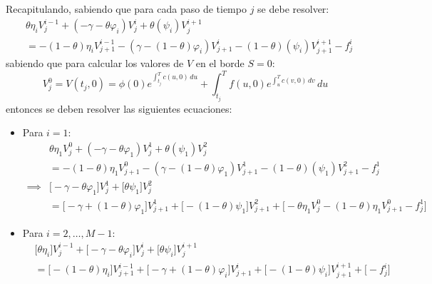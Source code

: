 Recapitulando, sabiendo que para cada paso de tiempo $j$ se debe resolver:
\begin{align*}
    &\theta\eta_i V_j^{i-1} +\left( -\gamma - \theta \varphi_i \right)V_j^i +\theta\left( \psi_i \right)V_j^{i+1} \\
    &= - (1-\theta)\eta_i V_{j+1}^{i-1} -\left( \gamma - (1-\theta) \varphi_i \right)V_{j+1}^i - (1-\theta)\left( \psi_i \right)V_{j+1}^{i+1} - f_j^i
\end{align*}
sabiendo que para calcular los valores de $V$ en el borde $S=0$:
\begin{equation*}
    V_j^0 = V(t_j, 0) = \phi(0) e^{\int_{t_j}^T c(u, 0)\,du} + \int_{t_j}^T f(u, 0) e^{\int_u^T c(v, 0)\,dv}\,du
\end{equation*}
entonces se deben resolver las siguientes ecuaciones:
\begin{itemize}
    \item Para $i=1$:
        \begin{align*}
            &\theta\eta_1 V_j^{0} +\left( -\gamma - \theta \varphi_1 \right)V_j^1 +\theta\left( \psi_1 \right)V_j^{2} \\
            &= - (1-\theta)\eta_1 V_{j+1}^{0} -\left( \gamma - (1-\theta) \varphi_1 \right)V_{j+1}^1 - (1-\theta)\left( \psi_1 \right)V_{j+1}^{2} - f_j^1 \\
            \implies &\bigg[ -\gamma - \theta \varphi_1 \bigg]V_j^1 + \bigg[ \theta \psi_1 \bigg]V_j^{2} \\
            &= \bigg[ - \gamma + (1-\theta) \varphi_1 \bigg]V_{j+1}^1 + \bigg[ - (1-\theta)\psi_1 \bigg]V_{j+1}^{2} + \bigg[ -\theta\eta_1 V_j^{0} - (1-\theta)\eta_1 V_{j+1}^{0} - f_j^1 \bigg]
        \end{align*}

    \item Para $i=2, \ldots, M-1$:
    \begin{align*}
        &\bigg[ \theta\eta_i \bigg] V_j^{i-1} + \bigg[ -\gamma - \theta \varphi_i \bigg] V_j^i + \bigg[ \theta \psi_i \bigg] V_j^{i+1} \\
        &= \bigg[ - (1-\theta)\eta_i \bigg] V_{j+1}^{i-1} + \bigg[ - \gamma + (1-\theta) \varphi_i \bigg] V_{j+1}^i + \bigg[ - (1-\theta)\psi_i \bigg] V_{j+1}^{i+1} + \bigg[ - f_j^i \bigg]
    \end{align*}


\end{itemize}
